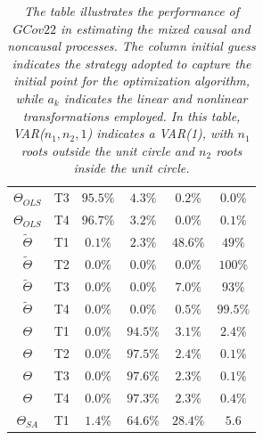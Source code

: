 \documentclass[<1p>]{elsarticle} %
\begin{document}
\begin{table}[H]
{\begin{tabular}{cccccc}
$\Theta_{OLS}$   & T3    & $95.5\%$      & $4.3\%$       & $0.2\%$       & $0.0\%$       \\
$\Theta_{OLS}$   & T4    & $96.7\%$      & $3.2\%$       & $0.0\%$       & $0.1\%$       \\ \hline
$\tilde{\Theta}$ & T1    & $0.1\%$       & $2.3\%$       & $48.6\%$      & $49\%$        \\
$\tilde{\Theta}$ & T2    & $0.0\%$       & $0.0\%$       & $0.0\%$       & $100\%$       \\
$\tilde{\Theta}$ & T3    & $0.0\%$       & $0.0\%$       & $7.0\%$       & $93\%$        \\
$\tilde{\Theta}$ & T4    & $0.0\%$       & $0.0\%$       & $0.5\%$       & $99.5\%$      \\ \hline
$\Theta$       & T1    & $0.0\%$       & $94.5\%$      & $3.1\%$       & $2.4\%$       \\
$\Theta$       & T2    & $0.0\%$       & $97.5\%$      & $2.4\%$       & $0.1\%$       \\
$\Theta$       & T3    & $0.0\%$       & $97.6\%$      & $2.3\%$       & $0.1\%$       \\
$\Theta$       & T4    & $0.0\%$       & $97.3\%$      & $2.3\%$       & $0.4\%$       \\ \hline
$\Theta_{SA}$    & T1    & $1.4\%$       & $64.6\%$      & $28.4\%$      & $5.6$         \\ \hline
\end{tabular}}
\caption*{\textit{The table illustrates the performance of $GCov22$ in estimating the mixed causal and noncausal processes. The column initial guess indicates the strategy adopted to capture the initial point for the optimization algorithm, while $a_k$ indicates the linear and nonlinear transformations employed. In this table, VAR($n_1,n_2,1$) indicates a VAR(1), with $n_1$ roots outside the unit circle and $n_2$ roots inside the unit circle.}}
\end{table}
\end{document}
